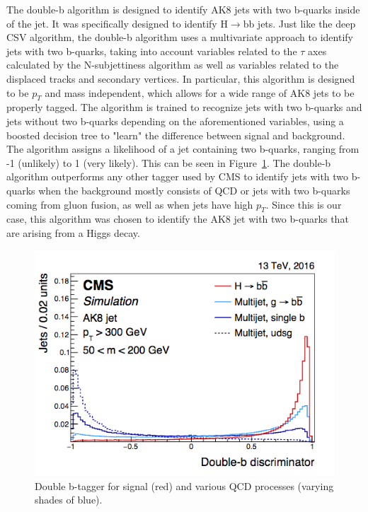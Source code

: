 The double-b algorithm is designed to identify AK8 jets with two b-quarks inside of the jet. It was specifically designed to identify H$\rightarrow$bb jets. Just like the deep CSV algorithm, the double-b algorithm uses a multivariate approach to identify jets with two b-quarks, taking into account variables related to the $\tau$ axes calculated by the N-subjettiness algorithm as well as variables related to the displaced tracks and secondary vertices. In particular, this algorithm is designed to be $p_{T}$ and mass independent, which allows for a wide range of AK8 jets to be properly tagged. The algorithm is trained to recognize jets with two b-quarks and jets without two b-quarks depending on the aforementioned variables, using a boosted decision tree to "learn" the difference between signal and background. The algorithm assigns a likelihood of a jet containing two b-quarks, ranging from -1 (unlikely) to 1 (very likely). This can be seen in Figure~\ref{Fig:doubleb}. The double-b algorithm outperforms any other tagger used by CMS to identify jets with two b-quarks when the background mostly consists of QCD or jets with two b-quarks coming from gluon fusion, as well as when jets have high $p_{T}$. Since this is our case, this algorithm was chosen to identify the AK8 jet with two b-quarks that are arising from a Higgs decay.
\begin{figure}[h!]
    \centering
        \includegraphics[width=\textwidth]{F4/doubleb.png}
        \caption{Double b-tagger for signal (red) and various QCD processes (varying shades of blue).}
        \label{Fig:doubleb}
\end{figure}

